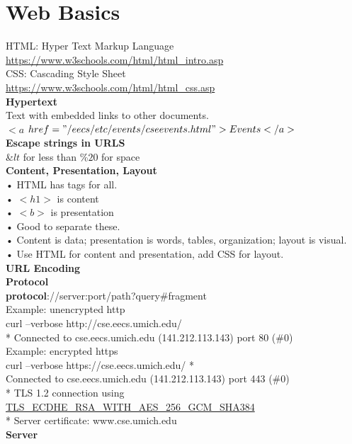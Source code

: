 \documentclass{article}
\begin{document}
\section{Web Basics}
HTML: Hyper Text Markup Language\\
\url{https://www.w3schools.com/html/html_intro.asp }\\
CSS: Cascading Style Sheet\\
\url{https://www.w3schools.com/html/html_css.asp}\\
\large{\textbf{Hypertext}}\\
Text with embedded links to other documents.\\
$<a $ $href="/eecs/etc/events/cseevents.html">\\
Events\\
</a>$\\
\large{\textbf{Escape strings in URLS}}\\
\&$lt$ for less than \%$20$ for space\\
\large{\textbf{Content, Presentation, Layout}}\\
• HTML has tags for all.\\
• $<h1>$ is content\\
• $<b>$ is presentation \\
• Good to separate these.\\
• Content is data; presentation is words, tables, organization; layout is
visual.\\
• Use HTML for content and presentation, add CSS for layout.\\
\large{\textbf{URL Encoding}}\\
\textbf{Protocol}\\
\textbf{protocol}://server:port/path?query#fragment\\
Example: unencrypted http\\
curl --verbose http://cse.eecs.umich.edu/ \\
* Connected to cse.eecs.umich.edu (141.212.113.143) port 80 (\#0)\\
Example: encrypted https\\
curl --verbose https://cse.eecs.umich.edu/ * \\ Connected to cse.eecs.umich.edu (141.212.113.143) port 443 (\#0)\\
* TLS 1.2 connection using \url{TLS_ECDHE_RSA_WITH_AES_256_GCM_SHA384} \\
* Server certificate: www.cse.umich.edu \\
\textbf{Server}\\
\end{document}
